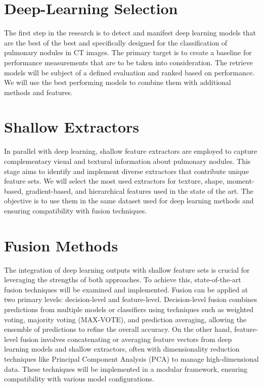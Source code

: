 \section{Deep-Learning Selection}
The first step in the research is to detect and manifest deep learning models that are the best of the best and specifically designed for the classification of pulmonary nodules in CT images. The primary target is to create a baseline for performance measurements that are to be taken into consideration. The retrieve models will be subject of a defined evaluation and ranked based on performance. We will use the best performing models to combine them with additional methods and features. 

\section{Shallow Extractors}
In parallel with deep learning, shallow feature extractors are employed to capture complementary visual and textural information about pulmonary nodules. This stage aims to identify and implement diverse extractors that contribute unique feature sets. We will select the most used extractors for texture, shape, moment-based, gradient-based, and hierarchical features used in the state of the art.
The objective is to use them in the same dataset used for deep learning methods and ensuring compatibility with fusion techniques.

\section{Fusion Methods}
The integration of deep learning outputs with shallow feature sets is crucial for leveraging the strengths of both approaches. To achieve this, state-of-the-art fusion techniques will be examined and implemented. Fusion can be applied at two primary levels: decision-level and feature-level. Decision-level fusion combines predictions from multiple models or classifiers using techniques such as weighted voting, majority voting (MAX-VOTE), and prediction averaging, allowing the ensemble of predictions to refine the overall accuracy. On the other hand, feature-level fusion involves concatenating or averaging feature vectors from deep learning models and shallow extractors, often with dimensionality reduction techniques like Principal Component Analysis (PCA) to manage high-dimensional data. These techniques will be implemented in a modular framework, ensuring compatibility with various model configurations.

